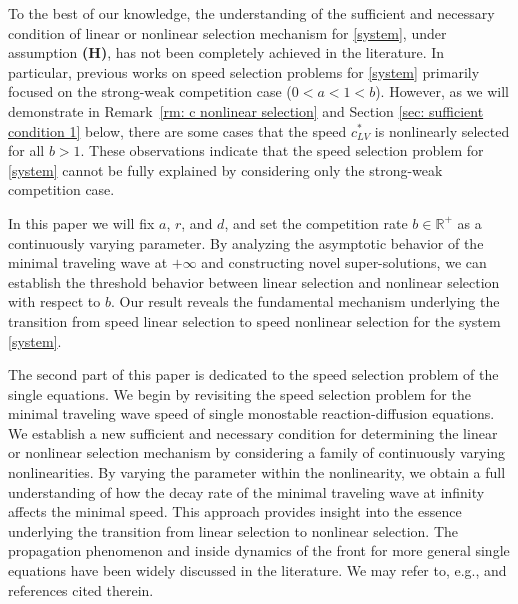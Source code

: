 \documentclass[11pt,a4paper]{article}
\numberwithin{equation}{section}
\numberwithin{figure}{section}
\begin{document}
To the best of our knowledge,
the understanding of the sufficient and necessary condition of linear or nonlinear selection mechanism for \eqref{system}, under assumption {\bf(H)}, has not been completely achieved in the literature.
In particular, previous works on speed selection problems for \eqref{system} primarily focused on the strong-weak competition case ($0<a<1<b$). %
 However, as we will demonstrate in Remark~\ref{rm: c nonlinear selection} and Section \ref{sec: sufficient condition 1} below, %
there are some cases that the speed $c_{LV}^{*}$ is nonlinearly selected for all $b>1$. These observations indicate that the speed selection problem for \eqref{system}
cannot be %
fully explained by considering only the strong-weak competition case. 

In this paper we will fix $a$, $r$, and $d$, and set the competition rate $b\in\mathbb{R}^+$ as a continuously %
varying
parameter.
By analyzing
the asymptotic behavior of the minimal traveling wave at $+\infty$ and constructing novel super-solutions,
we can establish the threshold behavior between linear selection and nonlinear selection with respect to $b$.
Our result reveals the fundamental mechanism underlying the transition from speed linear selection to speed nonlinear selection for the system \eqref{system}.


The second part of this paper is dedicated to the speed selection problem of the single equations. We begin by revisiting the speed selection problem
for the minimal traveling wave speed of single monostable reaction-diffusion equations.
We establish a new sufficient and necessary condition for determining the linear or nonlinear selection mechanism by considering a family of continuously varying nonlinearities.
By varying the parameter within the nonlinearity, we obtain a full understanding of how the decay rate of the minimal traveling wave
at infinity affects the minimal speed.
This approach provides insight into the essence underlying the transition from linear selection to nonlinear selection.
The propagation phenomenon and inside dynamics
of the front for more general single equations have been widely discussed in the literature.
We may refer to, e.g., \cite{Berestycki Hamel2012, Fife McLeod1977, Gardner et al 2012, Liang Zhao 2007, Roques et al 2012, Rothe1981, Stokes1976} and references cited therein.
\end{document}
